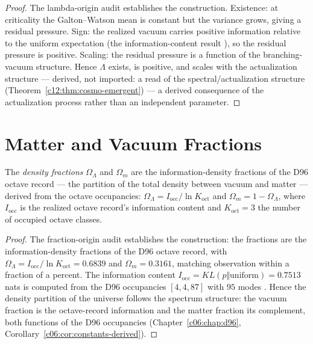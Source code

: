 \begin{proof}
The lambda-origin audit \cite{c12:QG230} establishes the construction. Existence: at criticality
the Galton--Watson mean is constant but the variance grows, giving a residual pressure.
Sign: the realized vacuum carries positive information relative to the uniform expectation
(the information-content result \cite{c12:QG228}), so the residual pressure is positive.
Scaling: the residual pressure is a function of the branching-vacuum structure. Hence
$\Lambda$ exists, is positive, and scales with the actualization structure --- derived, not
imported: a read of the spectral/actualization structure (Theorem~\ref{c12:thm:cosmo-emergent})
--- a derived consequence of the actualization process rather than an independent
parameter.
\end{proof}

\section{Matter and Vacuum Fractions}
\label{c12:sec:fractions}

\begin{theorem}
\label{c12:thm:fractions}
The \emph{density fractions} $\Omega_\Lambda$ and $\Omega_m$ are the information-density
fractions of the D96 octave record --- the partition of the total density between vacuum
and matter --- derived from the octave occupancies: $\Omega_\Lambda = I_{\mathrm{occ}}/\ln
K_{\mathrm{oct}}$ and $\Omega_m = 1 - \Omega_\Lambda$, where $I_{\mathrm{occ}}$ is the
realized octave record's information content and $K_{\mathrm{oct}} = 3$ the number of
occupied octave classes.
\end{theorem}

\begin{proof}
The fraction-origin audit \cite{c12:QG234} establishes the construction: the fractions are the
information-density fractions of the D96 octave record, with
$\Omega_\Lambda = I_{\mathrm{occ}}/\ln K_{\mathrm{oct}} = 0.6839$ and $\Omega_m = 0.3161$, matching
observation within a fraction of a percent. The information content
$I_{\mathrm{occ}} = KL(p\Vert\mathrm{uniform}) = 0.7513$ nats is computed from the D96
occupancies $[4,4,87]$ with $95$ modes \cite{c12:QG228}. Hence the density partition of the
universe follows the spectrum structure: the vacuum fraction is the octave-record
information and the matter fraction its complement, both functions of the D96 occupancies
(Chapter~\ref{c06:chap:d96}, Corollary~\ref{c06:cor:constants-derived}).
\end{proof}

